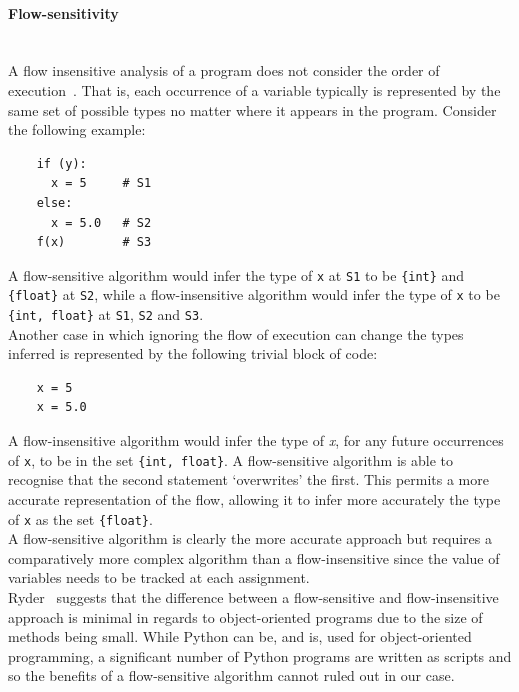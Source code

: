 \documentclass[12pt, titlepage]{article}
\begin{document}
\paragraph*{Flow-sensitivity}\mbox{} \\
A flow insensitive analysis of a program does not consider the order of execution~\cite{nielson99}. That is, each occurrence of a variable typically is represented by the same set of possible types no matter where it appears in the program. Consider the following example:
\begin{lstlisting}
    if (y):	
      x = 5     # S1
    else:
      x = 5.0   # S2
    f(x)        # S3
\end{lstlisting}
A flow-sensitive algorithm would infer the type of \texttt{x} at \texttt{S1} to be \texttt{\{int\}} and \texttt{\{float\}} at \texttt{S2}, while a flow-insensitive algorithm would infer the type of \texttt{x} to be \texttt{\{int, float\}} at \texttt{S1}, \texttt{S2} and \texttt{S3}. \\
\indent Another case in which ignoring the flow of execution can change the types inferred is represented by the following trivial block of code:
\begin{lstlisting}
    x = 5
    x = 5.0
\end{lstlisting}
A flow-insensitive algorithm would infer the type of \textit{x}, for any future occurrences of \texttt{x}, to be in the set \texttt{\{int, float\}}. A flow-sensitive algorithm is able to recognise that the second statement `overwrites' the first. This permits a more accurate representation of the flow, allowing it to infer more accurately the type of \texttt{x} as the set \texttt{\{float\}}. \\
\indent A flow-sensitive algorithm is clearly the more accurate approach but requires a comparatively more complex algorithm than a flow-insensitive since the value of variables needs to be tracked at each assignment. \\
\indent Ryder~\cite{ryder03} suggests that the difference between a flow-sensitive and flow-insensitive approach is minimal in regards to object-oriented programs due to the size of methods being small. While Python can be, and is, used for object-oriented programming, a significant number of Python programs are written as scripts and so the benefits of a flow-sensitive algorithm cannot ruled out in our case.
\end{document}
